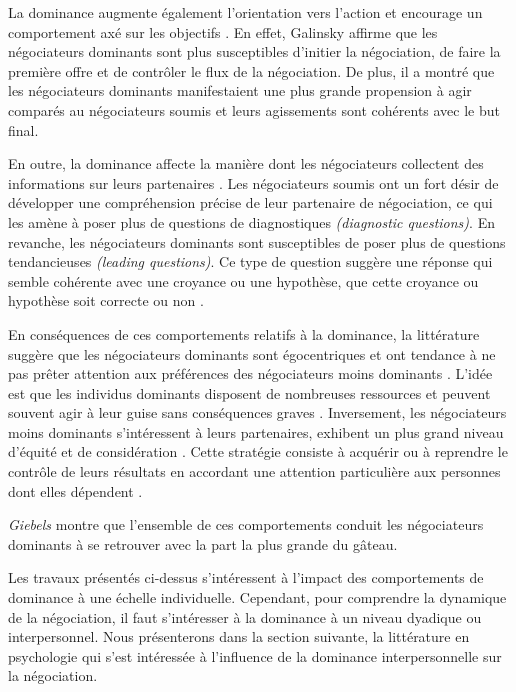 	
	 La dominance augmente également l'orientation vers l'action et encourage un comportement axé sur les objectifs \cite{van2006power}. En effet, Galinsky \cite{galinsky2003power} affirme que les négociateurs dominants sont plus susceptibles d'initier la négociation, de faire la première offre et de contrôler le flux de la négociation.  De plus, il a montré que les négociateurs dominants manifestaient une plus grande propension à agir comparés au négociateurs soumis et leurs agissements sont cohérents avec le but final.
	 
	 
	 En outre, la dominance affecte la manière dont les négociateurs collectent des informations sur leurs partenaires \cite{de2004influence}. Les négociateurs soumis ont un fort désir de développer une compréhension précise de leur partenaire de négociation, ce qui les amène à poser plus de questions  de diagnostiques \emph {(diagnostic questions)}.
	 En revanche, les négociateurs dominants sont susceptibles de poser plus de questions tendancieuses \emph {(leading questions)}. Ce type de question suggère une réponse  qui semble cohérente avec une croyance ou une hypothèse, que cette croyance ou hypothèse soit correcte ou non \cite{galinsky2003power}.
	
	En conséquences de ces comportements relatifs à la dominance, la littérature suggère que les négociateurs dominants sont égocentriques et ont tendance à ne pas prêter attention aux préférences des négociateurs moins dominants   \cite{fiske1993controlling, de1995impact}. L'idée est que les individus dominants disposent de nombreuses ressources et peuvent souvent agir à leur guise sans conséquences graves \cite{van2006power}. Inversement, les négociateurs moins dominants s'intéressent à leurs partenaires, exhibent un plus grand niveau d'équité et de considération \cite{de1995impact}. Cette stratégie consiste à acquérir ou à reprendre le contrôle de leurs résultats en accordant une attention particulière aux personnes dont elles dépendent \cite{fiske1993controlling}.
	
	\emph{Giebels} \cite{giebels2000interdependence} montre que l'ensemble de ces comportements conduit les négociateurs dominants à se retrouver avec la part la plus grande du gâteau.
	
	Les travaux présentés ci-dessus s'intéressent à l'impact des comportements de dominance à une échelle individuelle. Cependant, pour comprendre la dynamique de la négociation, il faut s'intéresser à la dominance à un niveau dyadique ou interpersonnel. 
	Nous présenterons dans la section suivante, la littérature en psychologie qui s'est intéressée à l'influence de la dominance interpersonnelle sur la négociation. 

